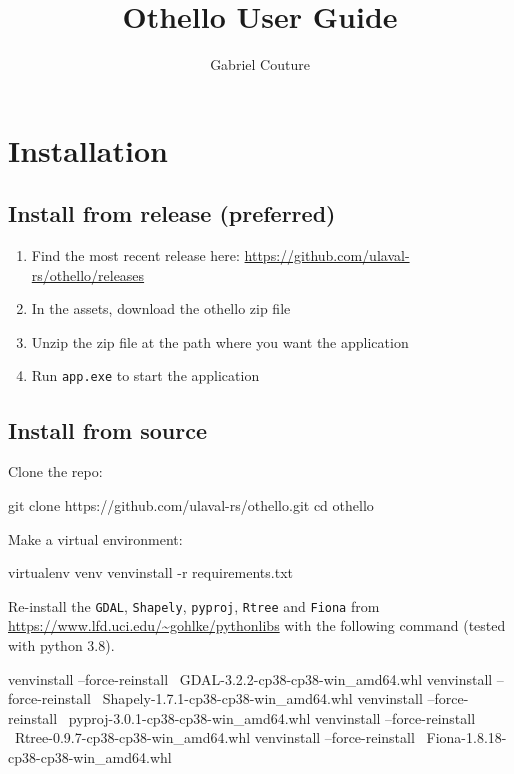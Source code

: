 \documentclass[11pt]{article}
\title{Othello User Guide}
\author{Gabriel Couture}
\begin{document}
\maketitle
\tableofcontents
\newpage

\section{Installation}\label{sec:installation}

\subsection{Install from release (preferred)}\label{subsec:install-from-release-(preferred)}
\begin{enumerate}
    \item Find the most recent release here: \url{https://github.com/ulaval-rs/othello/releases}
    \item In the assets, download the othello zip file
    \item Unzip the zip file at the path where you want the application
    \item Run \texttt{app.exe} to start the application
\end{enumerate}

\subsection{Install from source}\label{subsec:install-from-source}
Clone the repo:
\begin{code}
git clone https://github.com/ulaval-rs/othello.git
cd othello
\end{code}

\noindent Make a virtual environment:
\begin{code}
virtualenv venv
venv\Scripts\pip install -r requirements.txt
\end{code}

\noindent Re-install the \texttt{GDAL}, \texttt{Shapely}, \texttt{pyproj}, \texttt{Rtree} and \texttt{Fiona} from
\url{https://www.lfd.uci.edu/~gohlke/pythonlibs} with the following command (tested with python 3.8).
\begin{code}
venv\Scripts\pip install --force-reinstall \
  GDAL-3.2.2-cp38-cp38-win_amd64.whl
venv\Scripts\pip install --force-reinstall \
  Shapely-1.7.1-cp38-cp38-win_amd64.whl
venv\Scripts\pip install --force-reinstall \
  pyproj-3.0.1-cp38-cp38-win_amd64.whl
venv\Scripts\pip install --force-reinstall \
  Rtree-0.9.7-cp38-cp38-win_amd64.whl
venv\Scripts\pip install --force-reinstall \
  Fiona-1.8.18-cp38-cp38-win_amd64.whl
\end{code}
\end{document}
